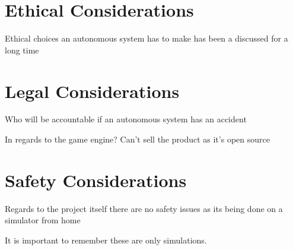 \section{Ethical Considerations}
Ethical choices an autonomous system has to make has been a discussed for a long time

\section{Legal Considerations}
Who will be accountable if an autonomous system has an accident

In regards to the game engine?
Can't sell the product as it's open source

\section{Safety Considerations}
Regards to the project itself there are no safety issues as its being done on a simulator from home

It is important to remember these are only simulations. 